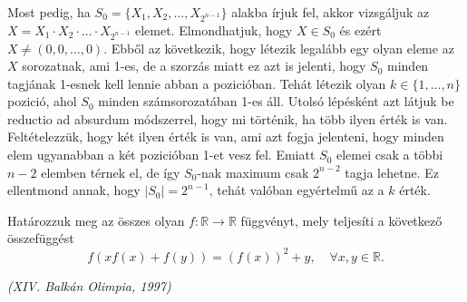 \begin{solution}
	Most pedig, ha $S_{0}=\{X_{1},X_{2},\dots,X_{2^{n-1}}\}$ alakba írjuk
	fel, akkor vizsgáljuk az $X=X_{1}\cdot X_{2}\cdot...\cdot X_{2^{n-1}}$
	elemet. Elmondhatjuk, hogy $X\in S_{0}$ és ezért $X\neq(0,0,\dots,0)$.
	Ebből az következik, hogy létezik legalább egy olyan eleme az $X$
	sorozatnak, ami 1-es, de a szorzás miatt ez azt is jelenti, hogy $S_{0}$
	minden tagjának 1-esnek kell lennie abban a pozicióban. Tehát létezik
	olyan $k\in\{1,...,n\}$ pozició, ahol $S_{0}$ minden számsorozatában
	1-es áll. Utolsó lépésként azt látjuk be reductio ad absurdum módszerrel,
	hogy mi történik, ha több ilyen érték is van. Feltételezzük, hogy
	két ilyen érték is van, ami azt fogja jelenteni, hogy minden elem
	ugyanabban a két pozicióban 1-et vesz fel. Emiatt $S_{0}$ elemei
	csak a többi $n-2$ elemben térnek el, de így $S_{0}$-nak maximum
	csak $2^{n-2}$ tagja lehetne. Ez ellentmond annak, hogy $|S_{0}|=2^{n-1}$,
	tehát valóban egyértelmű az a $k$ érték. 
\end{solution}
\begin{extraproblem}
	Határozzuk meg az összes olyan $f:\mathbb{R}\rightarrow\mathbb{R}$
	függvényt, mely teljesíti a következő összefüggést 
	\[
	f(xf(x)+f(y))=(f(x))^{2}+y,\phantom{aa}\forall x,y\in\mathbb{R}.
	\]
	\begin{flushright}
		\textit{(XIV. Balkán Olimpia, 1997)} 
		\par\end{flushright}
\end{extraproblem}
